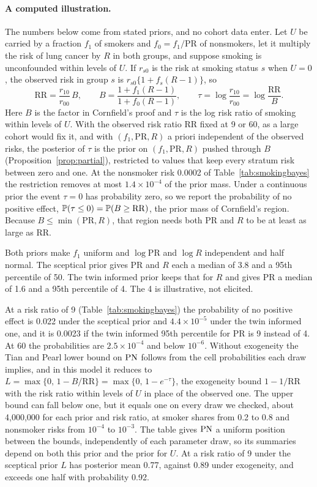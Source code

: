 \paragraph{A computed illustration.} The numbers below come from stated priors, and no cohort data enter. Let $U$ be carried by a fraction $f_1$ of smokers and $f_0 = f_1/\mathrm{PR}$ of nonsmokers, let it multiply the risk of lung cancer by $R$ in both groups, and suppose smoking is unconfounded within levels of $U$. If $r_{s0}$ is the risk at smoking status $s$ when $U=0$, the observed risk in group $s$ is $r_{s0}\{1+f_s(R-1)\}$, so
\[
\mathrm{RR}=\frac{r_{10}}{r_{00}}\,B,\qquad B=\frac{1+f_1(R-1)}{1+f_0(R-1)},\qquad \tau=\log\frac{r_{10}}{r_{00}}=\log\frac{\mathrm{RR}}{B}.
\]
Here $B$ is the factor in Cornfield's proof and $\tau$ is the log risk ratio of smoking within levels of $U$. With the observed risk ratio RR fixed at 9 or 60, as a large cohort would fix it, and with $(f_1, \mathrm{PR}, R)$ a priori independent of the observed risks, the posterior of $\tau$ is the prior on $(f_1, \mathrm{PR}, R)$ pushed through $B$ (Proposition~\ref{prop:partial}), restricted to values that keep every stratum risk between zero and one. At the nonsmoker risk 0.0002 of Table~\ref{tab:smokingbayes} the restriction removes at most $1.4 \times 10^{-4}$ of the prior mass. Under a continuous prior the event $\tau = 0$ has probability zero, so we report the probability of no positive effect, $\mathbb{P}(\tau\leq 0)=\mathbb{P}(B\geq\mathrm{RR})$, the prior mass of Cornfield's region. Because $B\leq\min(\mathrm{PR},R)$, that region needs both PR and $R$ to be at least as large as RR.

Both priors make $f_1$ uniform and $\log \mathrm{PR}$ and $\log R$ independent and half normal. The sceptical prior gives PR and $R$ each a median of 3.8 and a 95th percentile of 50. The twin informed prior keeps that for $R$ and gives PR a median of 1.6 and a 95th percentile of 4. The 4 is illustrative, not elicited.



At a risk ratio of 9 (Table~\ref{tab:smokingbayes}) the probability of no positive effect is 0.022 under the sceptical prior and $4.4 \times 10^{-5}$ under the twin informed one, and it is 0.0023 if the twin informed 95th percentile for PR is 9 instead of 4. At 60 the probabilities are $2.5 \times 10^{-4}$ and below $10^{-6}$. Without exogeneity the Tian and Pearl lower bound on $\mathrm{PN}$ follows from the cell probabilities each draw implies, and in this model it reduces to $L=\max\{0,\,1-B/\mathrm{RR}\}=\max\{0,\,1-e^{-\tau}\}$, the exogeneity bound $1-1/\mathrm{RR}$ with the risk ratio within levels of $U$ in place of the observed one. The upper bound can fall below one, but it equals one on every draw we checked, about 4,000,000 for each prior and risk ratio, at smoker shares from 0.2 to 0.8 and nonsmoker risks from $10^{-4}$ to $10^{-3}$. The table gives $\mathrm{PN}$ a uniform position between the bounds, independently of each parameter draw, so its summaries depend on both this prior and the prior for $U$. At a risk ratio of 9 under the sceptical prior $L$ has posterior mean 0.77, against 0.89 under exogeneity, and exceeds one half with probability 0.92.

